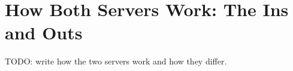\IfFileExists{IEEEtran.cls}{\ieeetrue\documentclass[conference]{IEEEtran}}{\ieeefalse\documentclass[twocolumn,10pt]{article}}
\begin{document}
\section{How Both Servers Work: The Ins and Outs}
TODO: write how the two servers work and how they differ.
\end{document}
